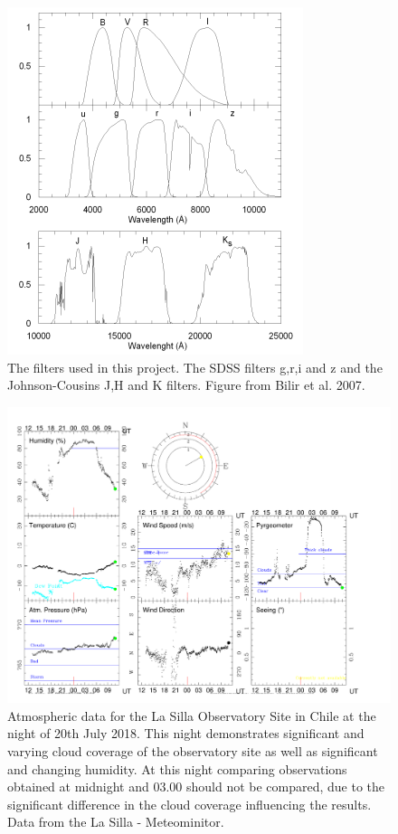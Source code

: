\documentclass[a4paper, 12pt, twoside]{article}
\begin{document}
\begin{figure}[t!]
\centering
\includegraphics[width=0.5\linewidth]{Figure/filters.png}
\caption{The filters used in this project. The SDSS filters g,r,i and z and the Johnson-Cousins J,H and K filters. Figure from Bilir et al. 2007.}
\label{fig:filters}
\end{figure}

%
\begin{figure}[htp!]
\includegraphics[width=1.1\linewidth]{Figure/end180720.pdf}
\caption{Atmospheric data for the La Silla Observatory Site in Chile at the night of 20th July 2018. This night demonstrates significant and varying cloud coverage of the observatory site as well as significant and changing humidity. At this night comparing observations obtained at midnight and 03.00 should not be compared, due to the significant difference in the cloud coverage influencing the results. Data from the La Silla - Meteominitor.}
\label{fig:poor_night}
\end{figure}
\end{document}
